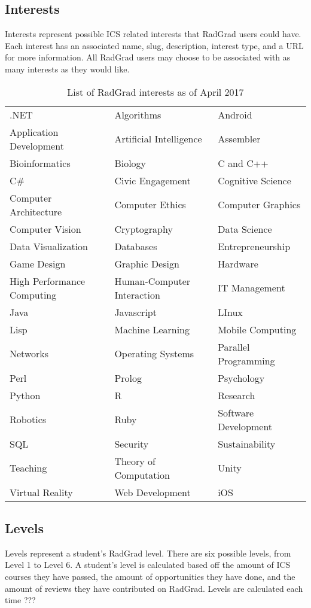 \subsection{Interests}
Interests represent possible ICS related interests that RadGrad users could have. Each interest has an associated name, slug, description, interest type, and a URL for more information. All RadGrad users may choose to be associated with as many interests as they would like. 

\begin{table}[h!]
\centering
\begin{tabular}{ l l l } 
.NET & Algorithms & Android \\ 
Application Development & Artificial Intelligence & Assembler \\
Bioinformatics & Biology & C and C++ \\
C\# & Civic Engagement & Cognitive Science \\
Computer Architecture & Computer Ethics & Computer Graphics \\
Computer Vision & Cryptography & Data Science \\
Data Visualization & Databases & Entrepreneurship \\
Game Design & Graphic Design & Hardware \\
High Performance Computing & Human-Computer Interaction & IT Management \\
Java & Javascript & LInux \\
Lisp & Machine Learning & Mobile Computing \\
Networks & Operating Systems & Parallel Programming \\
Perl & Prolog & Psychology \\
Python & R & Research \\
Robotics & Ruby & Software Development \\
SQL & Security & Sustainability \\
Teaching & Theory of Computation & Unity \\
Virtual Reality & Web Development & iOS
\end{tabular}
\caption{List of RadGrad interests as of April 2017}
\label{table:2}
\end{table}

\subsection{Levels}
Levels represent a student's RadGrad level. There are six possible levels, from Level 1 to Level 6. A student's level is calculated based off the amount of ICS courses they have passed, the amount of opportunities they have done, and the amount of reviews they have contributed on RadGrad. Levels are calculated each time ??? 

